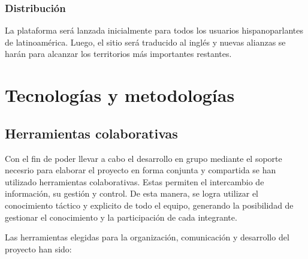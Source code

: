 \documentclass[oneside]{book}
\begin{document}
\subsection{Distribuci\'{o}n}
La plataforma ser\'{a} lanzada inicialmente para todos los usuarios hispanoparlantes de latinoam\'{e}rica.
Luego, el sitio será traducido al ingl\'{e}s y nuevas alianzas se harán para alcanzar los territorios m\'{a}s importantes restantes.


\newpage

%
%
\chapter{Tecnologías y metodologías}


\section{Herramientas colaborativas}

	Con el fin de poder llevar a cabo el desarrollo en grupo mediante el soporte necesrio para elaborar el proyecto en forma conjunta y compartida se han utilizado herramientas colaborativas. Estas permiten el intercambio de información, su gestión y control. De esta manera, se logra utilizar el conocimiento táctico y explicito de todo el equipo, generando la posibilidad de gestionar el conocimiento y la participación de cada integrante.
	\par
	Las herramientas elegidas para la organización, comunicación y desarrollo del proyecto han sido:
\end{document}
